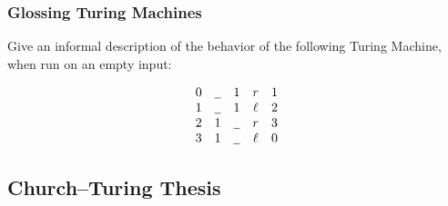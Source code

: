 \begin{frame}
\frametitle{Glossing Turing Machines}

Give an informal description of the behavior of the following Turing Machine, when run on an empty input:


\[
\begin{array}{ccccc}
0 &\underline{\enspace} &1 &r &1\\
1 &\underline{\enspace} &1 &\ell &2\\
2 &1 &\underline{\enspace} &r &3\\
3 &1 &\underline{\enspace} &\ell &0
\end{array}
\]



\end{frame}




\subsection{Church--Turing Thesis}



